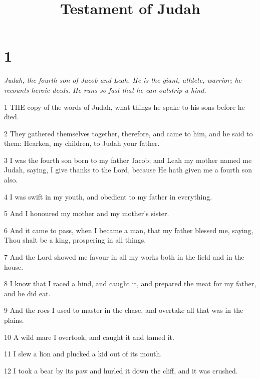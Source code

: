 

\title{Testament of Judah}

\chapter{1}

\par \textit{Judah, the fourth son of Jacob and Leah. He is the giant, athlete, warrior; he recounts heroic deeds. He runs so fast that he can outstrip a hind.}

\par 1 THE copy of the words of Judah, what things he spake to his sons before he died.

\par 2 They gathered themselves together, therefore, and came to him, and he said to them: Hearken, my children, to Judah your father.

\par 3 I was the fourth son born to my father Jacob; and Leah my mother named me Judah, saying, I give thanks to the Lord, because He hath given me a fourth son also.

\par 4 I was swift in my youth, and obedient to my father in everything.

\par 5 And I honoured my mother and my mother's sister.

\par 6 And it came to pass, when I became a man, that my father blessed me, saying, Thou shalt be a king, prospering in all things.

\par 7 And the Lord showed me favour in all my works both in the field and in the house.

\par 8 I know that I raced a hind, and caught it, and prepared the meat for my father, and he did eat.

\par 9 And the roes I used to master in the chase, and overtake all that was in the plains.

\par 10 A wild mare I overtook, and caught it and tamed it.

\par 11 I slew a lion and plucked a kid out of its mouth.

\par 12 I took a bear by its paw and hurled it down the cliff, and it was crushed.

